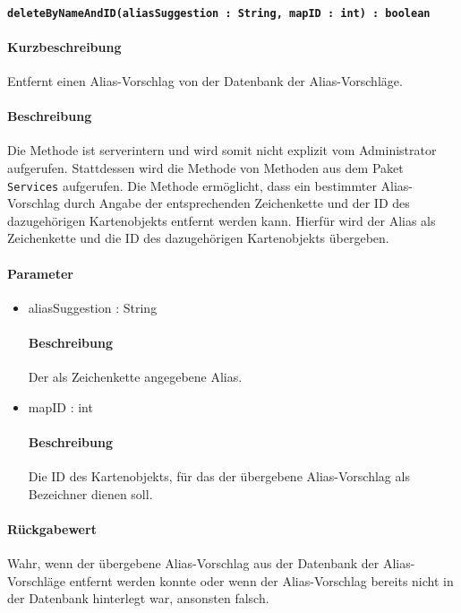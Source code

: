 \paragraph{\texttt{deleteByNameAndID(aliasSuggestion : String, mapID : int) : boolean}}%
\paragraph*{Kurzbeschreibung}
Entfernt einen Alias-Vorschlag von der Datenbank der Alias-Vorschläge.
\paragraph*{Beschreibung}
Die Methode ist serverintern und wird somit nicht explizit vom Administrator aufgerufen.
Stattdessen wird die Methode von Methoden aus dem Paket \texttt{Services} aufgerufen.
Die Methode ermöglicht, dass ein bestimmter Alias-Vorschlag durch Angabe der entsprechenden Zeichenkette und der ID des dazugehörigen Kartenobjekts entfernt werden kann.
Hierfür wird der Alias als Zeichenkette und die ID des dazugehörigen Kartenobjekts übergeben.
\paragraph*{Parameter}
\begin{itemize}
    \item aliasSuggestion : String
    		\paragraph*{Beschreibung}
    		Der als Zeichenkette angegebene Alias.
    	\item mapID : int
    		\paragraph*{Beschreibung}
    		Die ID des Kartenobjekts, für das der übergebene Alias-Vorschlag als Bezeichner dienen soll.
\end{itemize}
\paragraph*{Rückgabewert}
Wahr, wenn der übergebene Alias-Vorschlag aus der Datenbank der Alias-Vorschläge entfernt werden konnte oder wenn der Alias-Vorschlag bereits nicht in der Datenbank hinterlegt war, ansonsten falsch.
